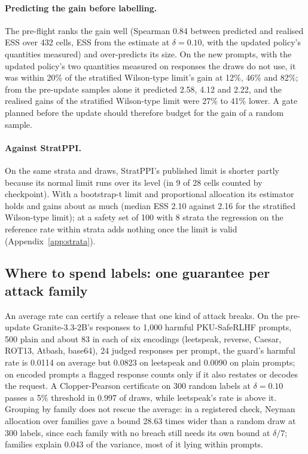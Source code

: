 \documentclass[letterpaper]{article} %
\newcommand{\SWL}{stratified Wilson-type limit}
\begin{document}
\paragraph{Predicting the gain before labelling.} The pre-flight ranks the gain well (Spearman 0.84 between predicted and
realised ESS over 432 cells, ESS from the estimate at $\delta=0.10$, with the updated policy's quantities measured) and
over-predicts its size. On the new prompts, with the updated policy's two quantities
measured on responses the draws do not use, it was within 20\% of the \SWL{}'s gain at 12\%, 46\% and 82\%; from the pre-update samples alone
it predicted 2.58, 4.12 and 2.22, and the realised gains of the \SWL{} were 27\% to 41\% lower. A gate planned before the update should
therefore budget for the gain of a random sample.

\paragraph{Against StratPPI.} On the same strata and draws, StratPPI's published limit is shorter partly because its
normal limit runs over its level (in 9 of 28 cells counted by checkpoint). With a bootstrap-t limit and proportional
allocation its estimator holds and gains about as much (median ESS 2.10 against 2.16 for the \SWL{}); at a safety set of
100 with 8 strata the regression on the reference rate within strata adds nothing once the limit is valid
(Appendix~\ref{app:strata}).

\subsection{Where to spend labels: one guarantee per attack family}
\label{sec:family}

An average rate can certify a release that one kind of attack breaks. On the pre-update Granite-3.3-2B's responses to
1,000 harmful PKU-SafeRLHF prompts, 500 plain and about 83 in each of six encodings (leetspeak, reverse, Caesar, ROT13,
Atbash, base64), 24 judged responses per prompt, the guard's harmful rate is 0.0114 on average but 0.0823 on leetspeak
and 0.0090 on plain prompts; on encoded prompts a flagged response counts only if it also restates or decodes the request. A Clopper-Pearson
certificate on 300 random labels at $\delta=0.10$ passes a 5\% threshold in 0.997 of draws, while leetspeak's rate is above it.
Grouping by family does not rescue the average: in a registered check, Neyman allocation over families gave a bound
28.63 times wider than a random draw at 300 labels, since each family with no breach still needs its own bound at $\delta/7$; families explain 0.043 of the variance, most of it lying within prompts.
\end{document}
